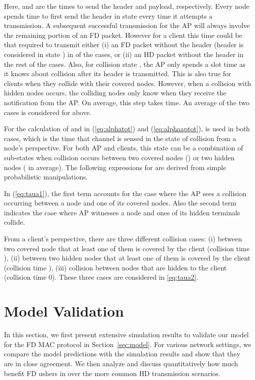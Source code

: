 \documentclass[10pt,journal,cspaper,compsoc]{IEEEtran}
\begin{document}
Here,  and  are the times to send the header and payload, respectively. Every node spends time to first send the header in state  every time it attempts a transmission. A subsequent successful transmission for the AP  will always involve the remaining portion of an FD packet. However for a client this time could be that required to transmit either (i) an FD packet without the header (header is considered in state ) in  of the cases, or (ii) an HD packet without the header in the rest of the cases. Also, for collision state , the AP only spends a slot time as it knows about collision after its header is transmitted. This is also true for clients when they collide with their covered nodes. However, when a collision with hidden nodes occurs, the colliding nodes only know when they receive the notification from the AP. On average, this step takes  time. An average of the two cases is considered for  above.     

For the calculation of  and  in (\ref{eq:alphatot}) and (\ref{eq:alphaaptot}),  is used in both cases, which is the time that channel is sensed in the state of collision from a node's perspective. For both AP and clients, this state can be a combination of sub-states when collision occurs between two covered nodes () or two hidden nodes ( in average). The following expressions for  are derived from simple probabilistic manipulations.



In (\ref{eq:taua1}), the first term accounts for the case where the AP sees a collision occurring between a node and one of its covered nodes. Also the second term indicates the case where AP witnesses a node and ones of its hidden terminals collide.

From a client's perspective, there are three different collision cases: (i) between two covered node that at least one of them is covered by the client (collision time ), (ii) between two hidden nodes that at least one of them is covered by the client (collision time ), (iii) collision between nodes that are hidden to the client (collision time 0). These three cases are considered in \ref{eq:taua2}.

\vspace{-5mm}
\section{Model Validation}
\label{sec:validation}

In this section, we first present extensive simulation results to validate our model for the FD MAC protocol in Section~\ref{sec:model}. For various network settings, we compare the model predictions with the simulation results and show that they are in close agreement. We then analyze and discuss quantitatively how much benefit FD ushers in over the more common HD transmission scenarios.
\end{document}
